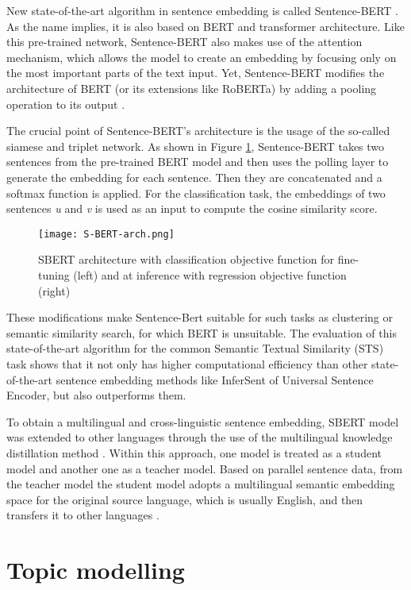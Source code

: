 \documentclass[fontsize=12pt,a4paper,twoside,openany]{scrbook}
\begin{document}
New state-of-the-art algorithm in sentence embedding is called Sentence-BERT \parencite{Reimers19}. As the name implies, it is also based on BERT and transformer architecture. Like this pre-trained network, Sentence-BERT also makes use of the attention mechanism, which allows the model to create an embedding by focusing only on the most important parts of the text input. Yet, Sentence-BERT modifies the architecture of BERT (or its extensions like RoBERTa) by adding a pooling operation to its output \parencite{Reimers19}.

The crucial point of Sentence-BERT's architecture is the usage of the so-called siamese and triplet network. As shown in Figure \ref{fig:S-BERT-arch}, Sentence-BERT takes two sentences from the pre-trained BERT model and then uses the polling layer to generate the embedding for each sentence. Then they are concatenated and a softmax function is applied. For the classification task, the embeddings of two sentences \emph{u} and \emph{v} is used as an input to compute the cosine similarity score.


\begin{figure}[h]
\centering
\texttt{[image: S-BERT-arch.png]}
\caption{SBERT architecture with classification objective function for fine-tuning (left) and at inference with regression objective function (right) \parencite[from][]{Reimers19}}
\label{fig:S-BERT-arch}
\end{figure}

These modifications make Sentence-Bert suitable for such tasks as clustering or semantic similarity search, for which BERT is unsuitable. The evaluation of this state-of-the-art algorithm for the common Semantic Textual Similarity (STS) task shows that it not only has higher computational efficiency than other state-of-the-art sentence embedding methods like InferSent of Universal Sentence Encoder, but also outperforms them.

To obtain a multilingual and cross-linguistic sentence embedding, SBERT model was extended to other languages through the use of the multilingual knowledge distillation method \parencite{Reimers20}. Within this approach, one model is treated as a student model and another one as a teacher model. Based on parallel sentence data, from the teacher model the student model adopts a multilingual semantic embedding space for the original source language, which is usually English, and then transfers it to other languages \parencite{Reimers20}. 

\section{Topic modelling}
\label{sec:B}
\end{document}
